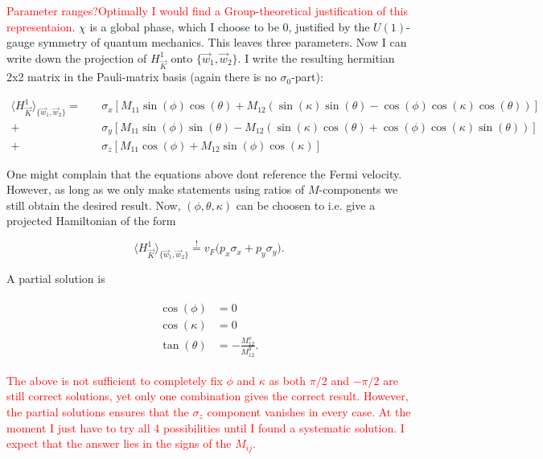 \documentclass[../../../main.tex]{subfiles}
\begin{document}
\textcolor{red}{Parameter ranges?}\textcolor{red}{Optimally I would find a Group-theoretical justification of this representaion}. $\chi$ is a global phase, which I choose to be 0, justified by the $U(1)$-gauge symmetry of quantum mechanics. This leaves three parameters. Now I can write down the projection of $H_{\vec{K}}^1$ onto $\{ \vec{w}_1, \vec{w}_2\}$. I write the resulting hermitian 2x2 matrix in the Pauli-matrix basis (again there is no $\sigma_0$-part):


\begin{align}
	\langle H_{\vec{K}}^1 \rangle_{\{\vec{w}_1, \vec{w}_2\}} = \quad &\sigma_x\left[M_{11} \sin(\phi)\cos(\theta) + M_{12}\left( \sin(\kappa) \sin(\theta) -\cos(\phi)\cos(\kappa)\cos(\theta)\right)\right] \\
	+&\sigma_y\left[M_{11} \sin(\phi) \sin(\theta) - M_{12} \left( \sin(\kappa) \cos(\theta) + \cos(\phi) \cos(\kappa) \sin(\theta)\right)\right] \\
	+&\sigma_z \left[M_{11} \cos(\phi) + M_{12} \sin(\phi) \cos(\kappa)\right]
\end{align}

One might complain that the equations above dont reference the Fermi velocity. However, as long as we only make statements using ratios of $M$-components we still obtain the desired result. Now, $(\phi, \theta, \kappa)$ can be choosen to i.e. give a projected Hamiltonian of the form 

\begin{equation}
	\langle H_{\vec{K}}^1 \rangle_{\{\vec{w}_1, \vec{w}_2\}} \overset{!}{=} v_F\big(p_x\sigma_x + p_y \sigma_y\big).	
\end{equation}

A partial solution is 

\begin{align}
	\begin{split}
		\cos(\phi) &= 0 \\
		\cos(\kappa) &= 0 \\
		\tan(\theta) &= - \frac{M_{12}^x}{M_{12}^y}.
	\end{split}
\end{align}

\textcolor{red}{The above is not sufficient to completely fix $\phi$ and $\kappa$ as both $\pi/2$ and $-\pi/2$ are still correct solutions, yet only one combination gives the correct result. However, the partial solutions ensures that the $\sigma_z$ component vanishes in every case. At the moment I just have to try all 4 possibilities until I found a systematic solution. I expect that the answer lies in the signs of the $M_{ij}$.} \\
\end{document}
